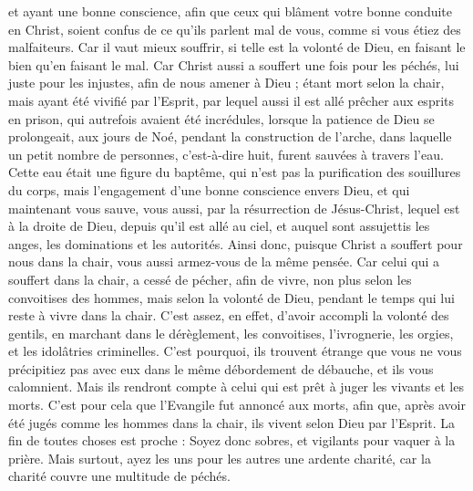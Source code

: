 \begin{multicols}{2}
et ayant une bonne conscience, afin que ceux qui blâment votre bonne conduite en Christ, soient confus de ce qu'ils parlent mal de vous, comme si vous étiez des malfaiteurs.
Car il vaut mieux souffrir, si telle est la volonté de Dieu, en faisant le bien qu’en faisant le mal.
Car Christ aussi a souffert une fois pour les péchés, lui juste pour les injustes, afin de nous amener à Dieu ; étant mort selon la chair, mais ayant été vivifié par l'Esprit,
par lequel aussi il est allé prêcher aux esprits en prison{},
qui autrefois avaient été incrédules, lorsque la patience de Dieu se prolongeait, aux jours de Noé, pendant la construction de l'arche, dans laquelle un petit nombre de personnes, c’est-à-dire huit, furent sauvées à travers l'eau.
Cette eau était une figure du baptême, qui n’est pas la purification des souillures du corps, mais l’engagement d’une bonne conscience envers Dieu, et qui maintenant vous sauve, vous aussi, par la résurrection de Jésus-Christ,
lequel est à la droite de Dieu, depuis qu’il est allé au ciel, et auquel sont assujettis les anges, les dominations et les autorités.
\VerseOne{}Ainsi donc, puisque Christ a souffert pour nous dans la chair, vous aussi armez-vous de la même pensée. Car celui qui a souffert dans la chair, a cessé de pécher,
afin de vivre, non plus selon les convoitises des hommes, mais selon la volonté de Dieu, pendant le temps qui lui reste à vivre dans la chair.
C’est assez, en effet, d’avoir accompli la volonté des gentils, en marchant dans le dérèglement, les convoitises, l’ivrognerie, les orgies, et les idolâtries criminelles.
C’est pourquoi, ils trouvent étrange que vous ne vous précipitiez pas avec eux dans le même débordement de débauche, et ils vous calomnient.
Mais ils rendront compte à celui qui est prêt à juger les vivants et les morts.
C’est pour cela que l’Evangile fut annoncé aux morts, afin que, après avoir été jugés comme les hommes dans la chair, ils vivent selon Dieu par l'Esprit.
La fin de toutes choses est proche : Soyez donc sobres, et vigilants pour vaquer à la prière.
Mais surtout, ayez les uns pour les autres une ardente charité, car la charité couvre une multitude de péchés.

\end{multicols}
